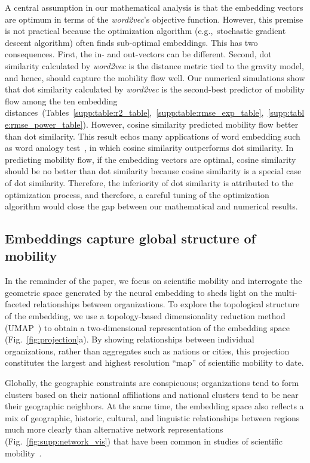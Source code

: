 \documentclass[12pt]{article} %
\def\eg{e.g.,~}
\begin{document}
A central assumption in our mathematical analysis is that the embedding vectors are optimum in terms of the {\it word2vec}'s objective function.
However, this premise is not practical because the optimization algorithm (\eg stochastic gradient descent algorithm) often finds sub-optimal embeddings.
This has two consequences.
First, the in- and out-vectors can be different.
Second, dot similarity calculated by {\it word2vec} is the distance metric tied to the gravity model, and hence, should capture the mobility flow well.
Our numerical simulations show that dot similarity calculated by {\it word2vec} is the second-best predictor of mobility flow among the ten embedding distances~(Tables~\ref{supp:table:r2_table},~\ref{supp:table:rmse_exp_table},~\ref{supp:table:rmse_power_table}).
However, cosine similarity predicted mobility flow better than dot similarity.
This result echos many applications of word embedding such as word analogy test~\autocite{levy2015improving}, in which cosine similarity outperforms dot similarity.
In predicting mobility flow, if the embedding vectors are optimal, cosine similarity should be no better than dot similarity because cosine similarity is a special case of dot similarity.
Therefore, the inferiority of dot similarity is attributed to the optimization process, and therefore, a careful tuning of the optimization algorithm would close the gap between our mathematical and numerical results.


\subsection*{Embeddings capture global structure of mobility}

In the remainder of the paper, we focus on scientific mobility and interrogate the geometric space generated by the neural embedding to sheds light on the multi-faceted relationships between organizations.
To explore the topological structure of the embedding, we use a topology-based dimensionality reduction method (UMAP~\autocite{mcinnes2018umap}) to obtain a two-dimensional representation of the embedding space (Fig.~\ref{fig:projection}a).
By showing relationships between individual organizations, rather than aggregates such as nations or cities, this projection constitutes the largest and highest resolution ``map'' of scientific mobility to date.

Globally, the geographic constraints are conspicuous; organizations tend to form clusters based on their national affiliations and national clusters tend to be near their geographic neighbors.
At the same time, the embedding space also reflects a mix of geographic, historic, cultural, and linguistic relationships between regions much more clearly than alternative network representations (Fig.~\ref{fig:supp:network_vis}) that have been common in studies of scientific mobility~\autocite{chinchilla2018global, czaika2018globalisation}.
\end{document}
